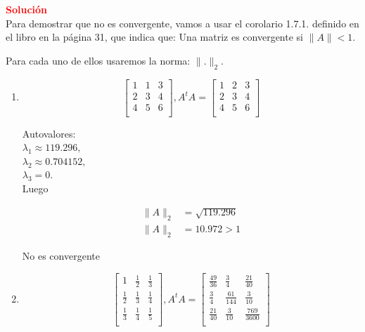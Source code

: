 \documentclass[12pt]{article}
\begin{document}
\noindent \textcolor{red}{\bf Solución}\\

Para demostrar que no es convergente, vamos a usar el corolario 1.7.1. definido en el libro en la página 31, que indica que: Una matriz es convergente si $\| A \| < 1$.

Para cada uno de ellos usaremos la norma: $\|.\|_2$.

\begin{enumerate}
    
    \item
    

$$\begin{bmatrix}
    1 & 1 & 3 \\
    2 & 3 & 4 \\
    4 & 5 & 6 \\
\end{bmatrix},
A^tA = \begin{bmatrix}
    1 & 2 & 3 \\
    2 & 3 & 4 \\
    4 & 5 & 6 \\
\end{bmatrix}
$$


Autovalores: \\
$\lambda_1 \approx 119.296, $\\
$\lambda_2 \approx 0.704152,$ \\
$\lambda_3 = 0. $\\

Luego 

\begin{align*}
    \parallel A \parallel_2 &= \sqrt{119.296}\\
    \parallel A \parallel_2 &= 10.972 > 1
\end{align*}

No es convergente


\item
    
$$
\begin{bmatrix}
    1 & \frac{1}{2} & \frac{1}{3} \\[4pt]
    \frac{1}{2} & \frac{1}{3} & \frac{1}{4} \\[4pt]
    \frac{1}{3} & \frac{1}{4} & \frac{1}{5} \\[4pt]
\end{bmatrix},
A^tA = \begin{bmatrix}
    \frac{49}{36} & \frac{3}{4} & \frac{21}{40} \\[4pt]
    \frac{3}{4} & \frac{61}{144} & \frac{3}{10} \\[4pt]
    \frac{21}{40} & \frac{3}{10} & \frac{769}{3600} \\[4pt]
\end{bmatrix}
$$



\end{enumerate}
\end{document}
